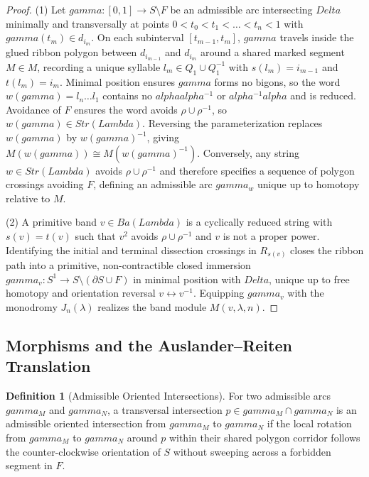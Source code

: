 \documentclass[11pt,a4paper,reqno]{amsart}
\def\mathcal#1{#1}%
\def\operatorname#1{#1}%
\def\forb{F}%
\def\gamma{gamma}%
\def\alpha{alpha}%
\def\Delta{Delta}%
\def\Lambda{Lambda}%
\def\emph#1{#1}%
\theoremstyle{definition}
\newtheorem{definition}[theorem]{Definition}
\theoremstyle{remark}
\newcommand{\forb}{\mathfrak{F}}
\begin{document}
\begin{proof}
(1) Let $\gamma \colon [0,1] \to \mathcal{S} \setminus \forb$ be an admissible arc intersecting $\Delta$ minimally and transversally at points $0 < t_0 < t_1 < \dots < t_n < 1$ with $\gamma(t_m) \in d_{i_m}$. On each subinterval $[t_{m-1}, t_m]$, $\gamma$ travels inside the glued ribbon polygon between $d_{i_{m-1}}$ and $d_{i_m}$ around a shared marked segment $M \in \mathcal{M}$, recording a unique syllable $l_m \in Q_1 \cup Q_1^{-1}$ with $s(l_m) = i_{m-1}$ and $t(l_m) = i_m$. Minimal position ensures $\gamma$ forms no bigons, so the word $w(\gamma) = l_n \dots l_1$ contains no $\alpha\alpha^{-1}$ or $\alpha^{-1}\alpha$ and is reduced. Avoidance of $\forb$ ensures the word avoids $\rho \cup \rho^{-1}$, so $w(\gamma) \in \operatorname{Str}(\Lambda)$. Reversing the parameterization replaces $w(\gamma)$ by $w(\gamma)^{-1}$, giving $M(w(\gamma)) \cong M(w(\gamma)^{-1})$. Conversely, any string $w \in \operatorname{Str}(\Lambda)$ avoids $\rho \cup \rho^{-1}$ and therefore specifies a sequence of polygon crossings avoiding $\forb$, defining an admissible arc $\gamma_w$ unique up to homotopy relative to $\mathcal{M}$.

(2) A primitive band $v \in \operatorname{Ba}(\Lambda)$ is a cyclically reduced string with $s(v) = t(v)$ such that $v^2$ avoids $\rho \cup \rho^{-1}$ and $v$ is not a proper power. Identifying the initial and terminal dissection crossings in $R_{s(v)}$ closes the ribbon path into a primitive, non-contractible closed immersion $\gamma_v \colon S^1 \to \mathcal{S} \setminus (\partial\mathcal{S} \cup \forb)$ in minimal position with $\Delta$, unique up to free homotopy and orientation reversal $v \leftrightarrow v^{-1}$. Equipping $\gamma_v$ with the monodromy $J_n(\lambda)$ realizes the band module $M(v, \lambda, n)$.
\end{proof}

\subsection{Morphisms and the Auslander--Reiten Translation}
\label{subsec:morphisms_ar_translation}

\begin{definition}[Admissible Oriented Intersections]
\label{def:oriented_intersections}
For two admissible arcs $\gamma_M$ and $\gamma_N$, a transversal intersection $p \in \gamma_M \cap \gamma_N$ is an \emph{admissible oriented intersection} from $\gamma_M$ to $\gamma_N$ if the local rotation from $\gamma_M$ to $\gamma_N$ around $p$ within their shared polygon corridor follows the counter-clockwise orientation of $\mathcal{S}$ without sweeping across a forbidden segment in $\forb$.
\end{definition}
\end{document}
